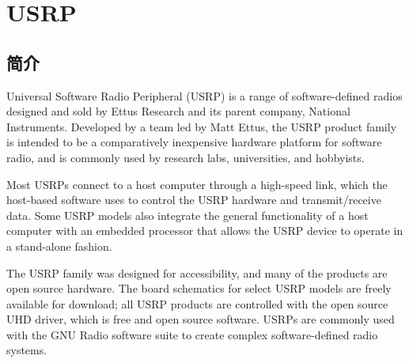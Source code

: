 \section{USRP}
	\subsection{简介}
	\par Universal Software Radio Peripheral (USRP) is a range of software-defined radios designed and sold by Ettus Research and its parent company, National Instruments. Developed by a team led by Matt Ettus, the USRP product family is intended to be a comparatively inexpensive hardware platform for software radio, and is commonly used by research labs, universities, and hobbyists.
	\par Most USRPs connect to a host computer through a high-speed link, which the host-based software uses to control the USRP hardware and transmit/receive data. Some USRP models also integrate the general functionality of a host computer with an embedded processor that allows the USRP device to operate in a stand-alone fashion.
	\par The USRP family was designed for accessibility, and many of the products are open source hardware. The board schematics for select USRP models are freely available for download; all USRP products are controlled with the open source UHD driver, which is free and open source software. USRPs are commonly used with the GNU Radio software suite to create complex software-defined radio systems. \cite{ wiki:USRP}
\endinput